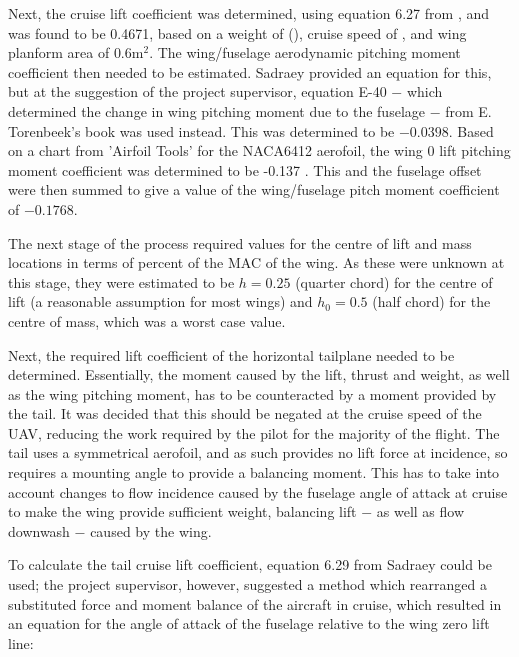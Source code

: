 \documentclass[../../main.tex]{subfiles}
\begin{document}
Next, the cruise lift coefficient was determined, using equation 6.27 from \cite{sadraey-13}, and was found to be 0.4671, based on a weight of  (), cruise speed of , and wing planform area of $0.6 \mathrm{m^2}$.
The wing/fuselage aerodynamic pitching moment coefficient then needed to be estimated.
Sadraey provided an equation for this, but at the suggestion of the project supervisor, equation E-40 $-$ which determined the change in wing pitching moment due to the fuselage $-$ from E. Torenbeek’s book \cite{torenbeek-76} was used instead.
This was determined to be $-0.0398$.
Based on a chart from 'Airfoil Tools' for the NACA6412 aerofoil, the wing 0 lift pitching moment coefficient was determined to be -0.137 \cite{airfoil-tools-19}.
This and the fuselage offset were then summed to give a value of the wing/fuselage pitch moment coefficient of $-0.1768.$ 

The next stage of the process required values for the centre of lift and mass locations in terms of percent of the MAC of the wing.
As these were unknown at this stage, they were estimated to be $h = 0.25$ (quarter chord) for the centre of lift (a reasonable assumption for most wings) and $h_0 = 0.5$ (half chord) for the centre of mass, which was a worst case value. 

Next, the required lift coefficient of the horizontal tailplane needed to be determined.
Essentially, the moment caused by the lift, thrust and weight, as well as the wing pitching moment, has to be counteracted by a moment provided by the tail.
It was decided that this should be negated at the cruise speed of the UAV, reducing the work required by the pilot for the majority of the flight.
The tail uses a symmetrical aerofoil, and as such provides no lift force at  incidence, so requires a mounting angle to provide a balancing moment.
This has to take into account changes to flow incidence caused by the fuselage angle of attack at cruise to make the wing provide sufficient weight, balancing lift $-$ as well as flow downwash $-$ caused by the wing. 

To calculate the tail cruise lift coefficient, equation 6.29 from Sadraey \cite{sadraey-13} could be used; the project supervisor, however, suggested a method which rearranged a substituted force and moment balance of the aircraft in cruise, which resulted in an equation for the angle of attack of the fuselage relative to the wing zero lift line: 

\end{document}
